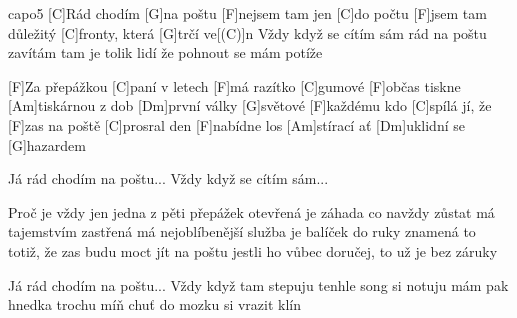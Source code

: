 \hfill capo5
[C]Rád chodím [G]na poštu
[F]nejsem tam jen [C]do počtu
[F]jsem tam důležitý [C]fronty, která [G]trčí ve[(C)]n
Vždy když se cítím sám
rád na poštu zavítám
tam je tolik lidí že
pohnout se mám potíže

[F]Za přepážkou [C]paní v letech [F]má razítko [C]gumové
[F]občas tiskne [Am]tiskárnou z dob [Dm]první války [G]světové
[F]každému kdo [C]spílá jí, že [F]zas na poště [C]prosral den
[F]nabídne los [Am]stírací ať [Dm]uklidní se [G]hazardem

Já rád chodím na poštu...
Vždy když se cítím sám...

Proč je vždy jen jedna z pěti přepážek otevřená
je záhada co navždy zůstat má tajemstvím zastřená
má nejoblíbenější služba je balíček do ruky
znamená to totiž, že zas budu moct jít na poštu
jestli ho vůbec doručej, to už je bez záruky

Já rád chodím na poštu...
Vždy když tam stepuju
tenhle song si notuju
mám pak hnedka trochu míň
chuť do mozku si vrazit klín